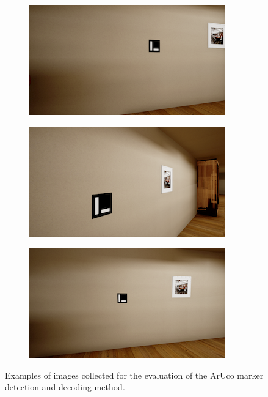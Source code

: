 \begin{figure}[H]
    \centering
    \begin{subfigure}{0.32\textwidth}
        \centering
        \includegraphics[width=\textwidth]{resources/png/06/markers/aruco/0.png}
    \end{subfigure}
    \hfill
    \begin{subfigure}{0.32\textwidth}
        \centering
        \includegraphics[width=\textwidth]{resources/png/06/markers/aruco/1.png}
    \end{subfigure}
    \hfill
    \begin{subfigure}{0.32\textwidth}
        \centering
        \includegraphics[width=\textwidth]{resources/png/06/markers/aruco/2.png}
    \end{subfigure}
    \caption{Examples of images collected for the evaluation of the ArUco marker detection and decoding method.}
    \label{fig:06.markers.aruco.examples}
\end{figure}

